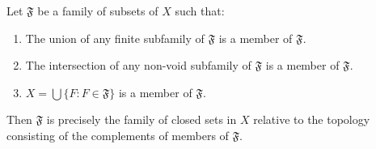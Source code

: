 Let $\mathfrak{F}$ be a family of subsets of $X$ such that:
\begin{enumerate}
\item The union of any finite subfamily of $\mathfrak{F}$ is a member of $\mathfrak{F}$.
\item The intersection of any non-void subfamily of $\mathfrak{F}$ is a member of $\mathfrak{F}$.
\item $X = \bigcup\{F : F \in \mathfrak{F}\}$ is a member of $\mathfrak{F}$.
\end{enumerate}
Then $\mathfrak{F}$ is precisely the family of closed sets in $X$ relative to the topology consisting of the complements of members of $\mathfrak{F}$.
